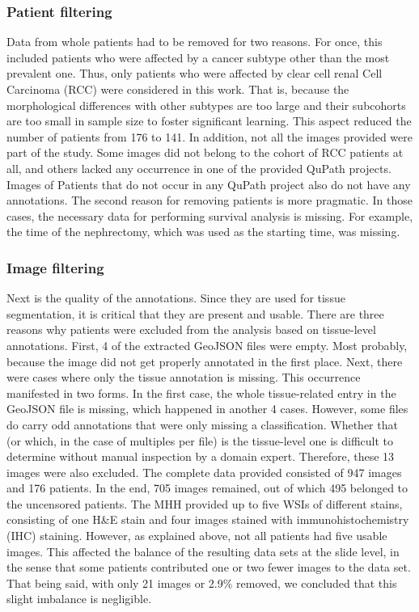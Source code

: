 \subsubsection{Patient filtering} 
Data from whole patients had to be removed for two reasons. For once, this included patients who were affected by a cancer subtype other than the most prevalent one. Thus, only patients who were affected by clear cell renal Cell Carcinoma (RCC) were considered in this work. That is, because the morphological differences with other subtypes are too large and their subcohorts are too small in sample size to foster significant learning. This aspect reduced the number of patients from 176 to 141. 
In addition, not all the images provided were part of the study. Some images did not belong to the cohort of RCC patients at all, and others lacked any occurrence in one of the provided QuPath projects. Images of Patients that do not occur in any QuPath project also do not have any annotations. 
The second reason for removing patients is more pragmatic. In those cases, the necessary data for performing survival analysis is missing. For example, the time of the nephrectomy, which was used as the starting time, was missing.

\subsubsection{Image filtering} 
Next is the quality of the annotations. Since they are used for tissue segmentation, it is critical that they are present and usable. There are three reasons why patients were excluded from the analysis based on tissue-level annotations. First, 4 of the extracted GeoJSON files were empty. Most probably, because the image did not get properly annotated in the first place. Next, there were cases where only the tissue annotation is missing. This occurrence manifested in two forms. In the first case, the whole tissue-related entry in the GeoJSON file is missing, which happened in another 4 cases. However, some files do carry odd annotations that were only missing a classification. Whether that (or which, in the case of multiples per file) is the tissue-level one is difficult to determine without manual inspection by a domain expert. Therefore, these 13 images were also excluded.
The complete data provided consisted of 947 images and 176 patients. In the end, 705 images remained, out of which 495 belonged to the uncensored patients. The MHH provided up to five WSIs of different stains, consisting of one H\&E stain and four images stained with immunohistochemistry (IHC) staining. However, as explained above, not all patients had five usable images. 
This affected the balance of the resulting data sets at the slide level, in the sense that some patients contributed one or two fewer images to the data set. That being said, with only 21 images or 2.9\% removed, we concluded that this slight imbalance is negligible. 

